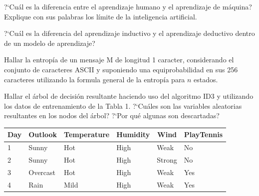 \documentclass[12pt]{exam}
\begin{document}
\begin{questions}

\question[2] ?`Cu\'al es la diferencia entre el aprendizaje humano y el aprendizaje de m\'aquina? Explique con sus palabras los l\'imite de la inteligencia artificial.
\addpoints

\question[2] ?`Cu\'al es la diferencia del aprendizaje inductivo y el aprendizaje deductivo dentro de un modelo de aprendizaje?
\addpoints

\question[2] Hallar la entrop\'ia de un mensaje M de longitud 1 caracter, considerando el conjunto de caracteres ASCII y suponiendo una equiprobabilidad en sus 256 caracteres utilizando la formula general de la entrop\'ia para $n$ estados.
\addpoints

\question[4] Hallar el \'arbol de decisi\'on resultante haciendo uso del algoritmo ID3 y utilizando los datos de entrenamiento de la Tabla 1. ?`Cu\'ales son las variables aleatorias resultantes en los nodos del \'arbol? ?`Por qu\'e algunas son descartadas?
\begin{table}[]
\centering
\label{playtennis}
\begin{tabular}{|l|l|l|l|l|l|}
\hline
\multicolumn{1}{|c|}{\textbf{Day}} & \multicolumn{1}{c|}{\textbf{Outlook}} & \multicolumn{1}{c|}{\textbf{Temperature}} & \multicolumn{1}{c|}{\textbf{Humidity}} & \multicolumn{1}{c|}{\textbf{Wind}} & \multicolumn{1}{c|}{\textbf{PlayTennis}} \\ \hline
1                                  & Sunny                                 & Hot                                       & High                                   & Weak                               & No                                       \\ \hline
2                                  & Sunny                                 & Hot                                       & High                                   & Strong                             & No                                       \\ \hline
3                                  & Overcast                              & Hot                                       & High                                   & Weak                               & Yes                                      \\ \hline
4                                  & Rain                                  & Mild                                      & High                                   & Weak                               & Yes                                      \\ \hline

\end{tabular}
\end{table}
\end{questions}
\end{document}
